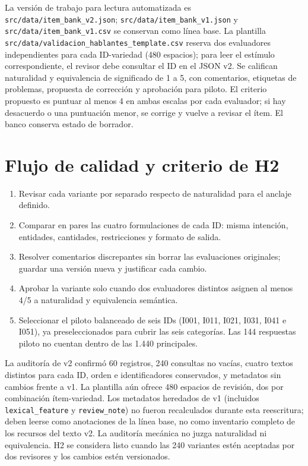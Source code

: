 \documentclass[conference]{IEEEtran}
\begin{document}
La versión de trabajo para lectura automatizada es \texttt{src/data/item\_bank\_v2.json}; \texttt{src/data/item\_bank\_v1.json} y \texttt{src/data/item\_bank\_v1.csv} se conservan como línea base. La plantilla \texttt{src/data/validacion\_hablantes\_template.csv} reserva dos evaluadores independientes para cada ID-variedad (480 espacios); para leer el estímulo correspondiente, el revisor debe consultar el ID en el JSON v2. Se califican naturalidad y equivalencia de significado de 1 a 5, con comentarios, etiquetas de problemas, propuesta de corrección y aprobación para piloto. El criterio propuesto es puntuar al menos 4 en ambas escalas por cada evaluador; si hay desacuerdo o una puntuación menor, se corrige y vuelve a revisar el ítem. El banco conserva estado de borrador.

\section{Flujo de calidad y criterio de H2}
\begin{enumerate}[leftmargin=*]
\item Revisar cada variante por separado respecto de naturalidad para el anclaje definido.
\item Comparar en pares las cuatro formulaciones de cada ID: misma intención, entidades, cantidades, restricciones y formato de salida.
\item Resolver comentarios discrepantes sin borrar las evaluaciones originales; guardar una versión nueva y justificar cada cambio.
\item Aprobar la variante solo cuando dos evaluadores distintos asignen al menos 4/5 a naturalidad y equivalencia semántica.
\item Seleccionar el piloto balanceado de seis IDs (I001, I011, I021, I031, I041 e I051), ya preseleccionados para cubrir las seis categorías. Las 144 respuestas piloto no cuentan dentro de las 1.440 principales.
\end{enumerate}

La auditoría de v2 confirmó 60 registros, 240 consultas no vacías, cuatro textos distintos para cada ID, orden e identificadores conservados, y metadatos sin cambios frente a v1. La plantilla aún ofrece 480 espacios de revisión, dos por combinación ítem-variedad. Los metadatos heredados de v1 (incluidos \texttt{lexical\_feature} y \texttt{review\_note}) no fueron recalculados durante esta reescritura; deben leerse como anotaciones de la línea base, no como inventario completo de los recursos del texto v2. La auditoría mecánica no juzga naturalidad ni equivalencia. H2 se considera listo cuando las 240 variantes estén aceptadas por dos revisores y los cambios estén versionados.
\end{document}
